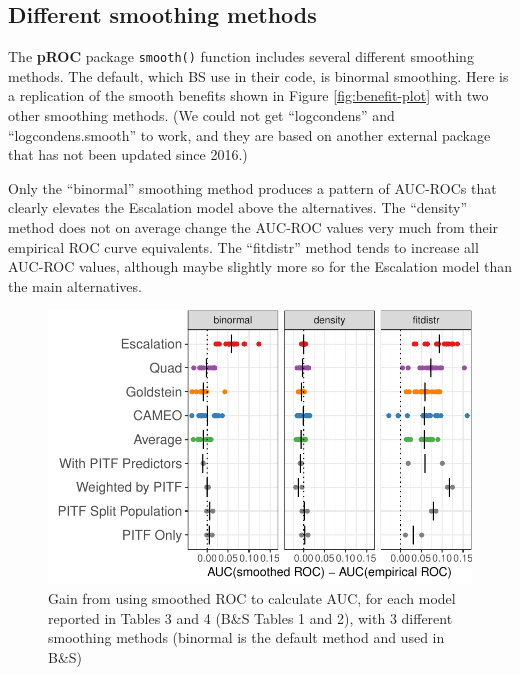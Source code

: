 \documentclass[
]{article}
\begin{document}
\hypertarget{different-smoothing-methods}{%
\subsection{Different smoothing methods}\label{different-smoothing-methods}}

The \textbf{pROC} package \texttt{smooth()} function includes several different smoothing methods. The default, which BS use in their code, is binormal smoothing. Here is a replication of the smooth benefits shown in Figure \ref{fig:benefit-plot} with two other smoothing methods. (We could not get ``logcondens'' and ``logcondens.smooth'' to work, and they are based on another external package that has not been updated since 2016.)

Only the ``binormal'' smoothing method produces a pattern of AUC-ROCs that clearly elevates the Escalation model above the alternatives. The ``density'' method does not on average change the AUC-ROC values very much from their empirical ROC curve equivalents. The ``fitdistr'' method tends to increase all AUC-ROC values, although maybe slightly more so for the Escalation model than the main alternatives.

\begin{figure}

{\centering \includegraphics[width=.8\linewidth]{paper_files/figure-latex/smooth-benefit-plot-extended-1} 

}

\caption{Gain from using smoothed ROC to calculate AUC, for each model reported in Tables 3 and 4 (B\&S Tables 1 and 2), with 3 different smoothing methods (binormal is the default method and used in B\&S)}\label{fig:smooth-benefit-plot-extended}
\end{figure}
\end{document}
